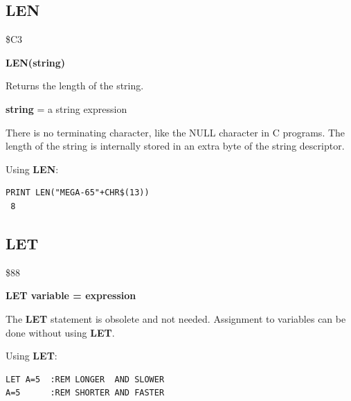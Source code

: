 
\newpage
\subsection{LEN}
\begin{description}[leftmargin=2cm,style=nextline]
\item [Token:] \$C3
\item [Format:] {\bf LEN(string)}
\item [Usage:] Returns the length of the string.

               {\bf string} = a string expression

\item [Remarks:] There is no terminating character, like the
                 NULL character in C programs. The length of
                 the string is internally stored in an extra byte
                 of the string descriptor.

\item [Example:] Using {\bf LEN}:
\begin{tcolorbox}[colback=black,coltext=white]
\verbatimfont{\codefont}
\begin{verbatim}
PRINT LEN("MEGA-65"+CHR$(13))
 8
\end{verbatim}
\end{tcolorbox}
\end{description}


\newpage
\subsection{LET}
\begin{description}[leftmargin=2cm,style=nextline]
\item [Token:] \$88
\item [Format:] {\bf LET variable = expression}
\item [Usage:] The {\bf LET} statement is obsolete and not needed.
               Assignment to variables can be done without using
               {\bf LET}.

\item [Example:] Using {\bf LET}:
\begin{tcolorbox}[colback=black,coltext=white]
\verbatimfont{\codefont}
\begin{verbatim}
LET A=5  :REM LONGER  AND SLOWER
A=5      :REM SHORTER AND FASTER
\end{verbatim}
\end{tcolorbox}
\end{description}

